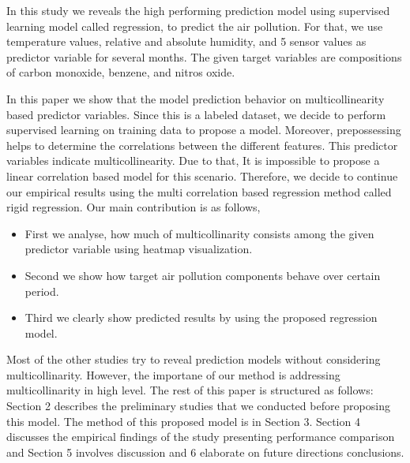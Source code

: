 {}
In this study we reveals the high performing prediction model
using supervised learning model called regression, to predict the air pollution.
For that, we use temperature values, relative and absolute humidity, 
and 5 sensor values as predictor variable for several months.
The given target variables are compositions of carbon monoxide, benzene, and nitros oxide.

{}
In this paper we show that the model prediction behavior on multicollinearity based predictor variables. 
Since this is a labeled dataset, we 
decide to perform supervised learning on training data to propose a model.
Moreover, prepossessing helps to determine the 
correlations between the different features.
This predictor variables indicate multicollinearity.
Due to that, It is impossible to propose a linear correlation based model for this scenario. 
Therefore, we decide to continue our empirical 
results using the multi correlation based regression method called rigid regression. 
Our main contribution is as follows,
\begin{itemize}
	\item First we analyse, how much of multicollinarity consists among the given predictor variable using heatmap visualization.
	\item Second we show how target air pollution components behave over certain period.
	\item Third we clearly show predicted results by using the proposed regression model.
\end{itemize}

{}
Most of the other studies try to reveal prediction models without considering multicollinarity. 
However, the importane of our method is addressing multicollinarity in high level.
{}
The rest of this paper is structured as follows:
Section 2 describes the preliminary studies that we conducted before proposing this model.
The method of this proposed model is in Section 3.
Section 4 discusses the empirical findings of the study presenting performance comparison
and Section 5 involves discussion and 6 elaborate on future directions conclusions.


